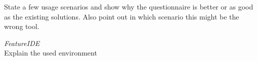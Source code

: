 State a few usage scenarios and show why the questionnaire is better or as good as the existing solutions. Also point out in which scenario this might be the wrong tool.

\textit{FeatureIDE}\\
Explain the used environment